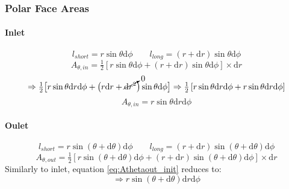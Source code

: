 \documentclass[12pt, letterpaper, twoside]{article}
\begin{document}
        \subsubsection{Polar Face Areas}
        \paragraph{Inlet}
            \begin{equation*}
                l_{short} = r\sin\theta \textrm{d}\phi \qquad
                l_{long} = (r + \textrm{d}r)\sin\theta \textrm{d}\phi 
            \end{equation*}
            \begin{equation}\label{eq:Athetain_init}
                A_{\theta,in} = \tfrac{1}{2} \left[r\sin\theta \textrm{d}\phi +  (r + \textrm{d}r)\sin\theta \textrm{d}\phi\right] \times \textrm{d}r
            \end{equation}
            \begin{equation*}
                \Rightarrow
                \tfrac{1}{2} \big[r\sin\theta \textrm{d}r \textrm{d}\phi +  \big(r\textrm{d}r + \cancelto{0}{\textrm{d}r^2}\big)\sin\theta \textrm{d}\phi\big] 
                \Rightarrow
                \tfrac{1}{2} \left[r\sin\theta \textrm{d}r \textrm{d}\phi + r\sin\theta \textrm{d}r \textrm{d}\phi\right]
            \end{equation*}
            \begin{equation}\label{eq:Athetain_final}
                A_{\theta,in} = r\sin\theta \textrm{d}r \textrm{d}\phi
            \end{equation}

        \paragraph{Oulet}
            \begin{equation*}
                l_{short} = r\sin\left(\theta + \textrm{d}\theta\right) \textrm{d}\phi \qquad
                l_{long} = (r + \textrm{d}r)\sin\left(\theta + \textrm{d}\theta\right) \textrm{d}\phi 
            \end{equation*}
            \begin{equation}\label{eq:Athetaout_init}
                A_{\theta,out} = \tfrac{1}{2} \left[r\sin\left(\theta + \textrm{d}\theta\right) \textrm{d}\phi +  (r + \textrm{d}r)\sin\left(\theta + \textrm{d}\theta\right) \textrm{d}\phi \right] \times \textrm{d}r
            \end{equation}
            Similarly to inlet, equation \ref{eq:Athetaout_init} reduces to:
            \begin{equation*}
                \Rightarrow
                r\sin\left(\theta + \textrm{d}\theta \right) \textrm{d}r \textrm{d}\phi
            \end{equation*}
            
\end{document}
